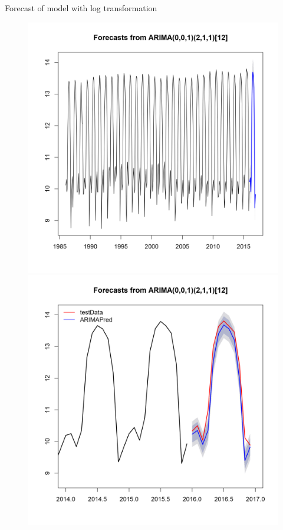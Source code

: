 \documentclass[xcolor=dvipsnames]{beamer}
\begin{document}
\begin{frame}{Forecast of model with log transformation}
\vspace{-1em}
\begin{figure}
\centering\includegraphics[width=.47\linewidth]{../normalplots/forecast95-fitLV-plot.png} \hfill \centering\includegraphics[width=.47\linewidth]{../normalplots/forecastGOOD-fitLV-plot.png}
\end{figure}

\vfill 
\end{frame}
\end{document}
